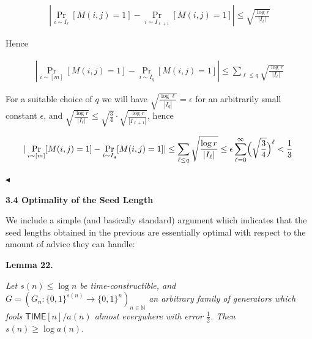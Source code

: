 \[\begin{gathered}
|\Pr_{i\sim I_{\ell}}[M(i,j)=1]-\Pr_{i\sim I_{\ell+1}}[M(i,j)=1]|\leq\sqrt{\frac{\log r}{|I_{\ell}|}}
\end{gathered}\]


Hence\par


\[\begin{gathered}
|\Pr_{i\sim[m]}[M(i,j)=1]-\Pr_{i\sim I_{q}}[M(i,j)=1]|\leq\sum_{\ell\leq q}\sqrt{\frac{\log r}{|I_{\ell}|}}
\end{gathered}\]


For a suitable choice of $q$ we will have $\sqrt{\frac{\log\ell}{|I_{q}|}}=\epsilon$ for an arbitrarily small constant $\epsilon$, and $\sqrt{\frac{\log r}{|I_{\ell}|}}\leq\sqrt{\frac{3}{4}}\cdot\sqrt{\frac{\log r}{|I_{\ell+1}|}}$, hence\par


\[\begin{gathered}
|\Pr_{i\sim[m]}[M(i,j)=1]-\Pr_{i\sim I_{q}}[M(i,j)=1]|\leq\sum_{\ell\leq q}\sqrt{\frac{\log r}{|I_{\ell}|}}\leq\epsilon\sum_{\ell=0}^{\infty}\Bigl{(}\sqrt{\frac{3}{4}}\Bigr{)}^{\ell}<\frac{1}{3}\
\end{gathered}\]


$\blacktriangleleft$\par






\par\medskip\noindent\textbf{
3.4 Optimality of the Seed Length}\par




We include a simple (and basically standard) argument which indicates that the seed lengths obtained in the previous are essentially optimal with respect to the amount of advice they can handle:\par





\par\medskip\noindent\textbf{
\textbf{Lemma 22}\textbf{.}
}\par



\emph{Let $s(n)\leq\log n$ be time-constructible, and $G=(G_{n}:\{0,1\}^{s(n)}\to\{0,1\}^{n})_{n\in\mathbb{N}}$ an arbitrary family of generators which fools ${\mathsf{TIME}}[n]/a(n)$ almost everywhere with error $\frac{1}{2}$. Then $s(n)\geq\log a(n)$.}\par




